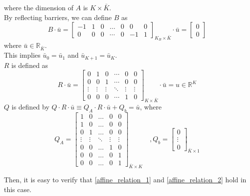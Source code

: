 \documentclass[11pt]{article}
\newcommand{\R}{\ensuremath{\mathbb{R}}}
\begin{document}
where the dimension of $A$ is $K\times\bar{K}$.\\
By reflecting barriers, we can define $B$ as
\begin{equation}
B\cdot\bar{u} =\begin{bmatrix}
-1&1&0&\dots&0&0&0\\
0&0&0&\cdots&0&-1&1
\end{bmatrix}_{K_B\times \bar{K}}\cdot\bar{u} = \begin{bmatrix}
0\\
0
\end{bmatrix}
\end{equation}
where $\bar{u} \in \R_{\bar{K}}$.\\
This implies $\bar{u}_0 = \bar{u}_1$ and $\bar{u}_{K+1} = \bar{u}_K$.\\
$R$ is defined as
\begin{equation}
R\cdot \bar{u} =\begin{bmatrix}
0&1&0&\cdots&0&0\\
0&0&1&\cdots&0&0\\
\vdots&\vdots&\vdots&\ddots&\vdots&\vdots\\
0&0&0&\cdots&1&0
\end{bmatrix}_{K\times\bar{K}}\cdot \bar{u}
= u\in \R^{K}
\end{equation}
$Q$ is defined by $Q\cdot R\cdot\bar{u}\equiv Q_A\cdot R\cdot\bar{u}+Q_b = \bar{u}$, where
\begin{equation}
Q_A = \begin{bmatrix}
1& 0&\dots&0&0\\
1&0&\dots&0&0\\
0&1&\dots&0&0\\
\vdots&\vdots&\ddots&\vdots&\vdots\\
0&0&\dots&1&0\\
0&0&\dots&0&1\\
0&0&\dots&0&1
\end{bmatrix}_{\bar{K}\times K}\quad , Q_b = \begin{bmatrix}
0\\
\vdots\\
0
\end{bmatrix}_{\bar{K}\times 1}
\end{equation}

Then, it is easy to verify that \eqref{affine_relation_1} and \eqref{affine_relation_2} hold in this case.
\end{document}
